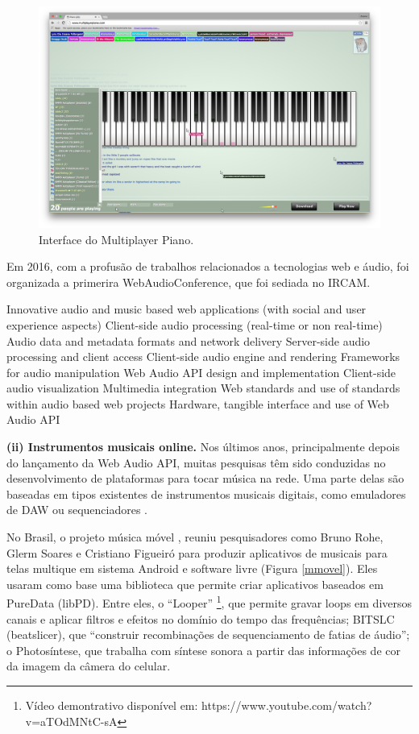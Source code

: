 \begin{figure}[ht]
    \caption{\label{multiplayer}Interface do Multiplayer Piano.}
    \begin{center}
        \includegraphics[width=1\linewidth]{pictures/cap2/multiplayerpiano}
    \end{center}
\end{figure}

Em 2016, com a profusão de trabalhos relacionados a tecnologias web e áudio, foi organizada a primerira WebAudioConference, que foi sediada no IRCAM. 


Innovative audio and music based web applications (with social and user experience aspects)
Client-side audio processing (real-time or non real-time)
Audio data and metadata formats and network delivery
Server-side audio processing and client access
Client-side audio engine and rendering
Frameworks for audio manipulation
Web Audio API design and implementation
Client-side audio visualization
Multimedia integration
Web standards and use of standards within audio based web projects 
Hardware, tangible interface and use of Web Audio API

\textbf{(ii) Instrumentos musicais online.} Nos últimos anos, principalmente depois do lançamento da Web Audio API, muitas pesquisas têm sido conduzidas no desenvolvimento de plataformas para tocar música na rede. Uma parte delas são baseadas em tipos existentes de instrumentos musicais digitais, como emuladores de DAW \cite{Jillings2017} ou sequenciadores \cite{Feenstra2016}.

No Brasil, o projeto música móvel \cite{Rohde2014}, reuniu pesquisadores como Bruno Rohe, Glerm Soares e Cristiano Figueiró para produzir aplicativos de musicais para telas multique em sistema Android e software livre (Figura \ref{mmovel}). Eles usaram como base uma biblioteca que permite criar aplicativos baseados em PureData (libPD). Entre eles, o ``Looper'' \footnote{Vídeo demontrativo disponível em: https://www.youtube.com/watch?v=aTOdMNtC-sA}, que permite gravar loops em diversos canais e aplicar filtros e efeitos no domínio do tempo das frequências; B\/I\/T\/S\/L\/C (beatslicer), que ``construir
recombinações de sequenciamento de fatias de áudio''; o Photosíntese, que trabalha com síntese sonora a partir das informações de cor da imagem da câmera do celular.

